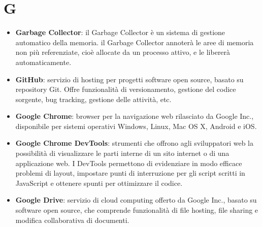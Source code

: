 \newpage
\section{G}

\begin{itemize}
	\item \textbf{Garbage Collector}: il Garbage Collector è un sistema di gestione automatico della memoria. il Garbage Collector annoterà le aree di memoria non più referenziate, cioè allocate da un processo attivo, e le libererà automaticamente.
	\item \textbf{GitHub}: servizio di hosting per progetti software open source, basato su repository Git. Offre funzionalità di versionamento, gestione del codice sorgente, bug tracking, gestione delle attività, etc.
	\item \textbf{Google Chrome}: browser per la navigazione web rilasciato da Google Inc., disponibile per sistemi operativi Windows, Linux, Mac OS X, Android e iOS.
	\item \textbf{Google Chrome DevTools}: strumenti che offrono agli sviluppatori web la possibilità di visualizzare le parti interne di un sito internet o di una applicazione web. I DevTools permettono di evidenziare in modo efficace problemi di layout, impostare punti di interruzione per gli script scritti in JavaScript e ottenere spunti per ottimizzare il codice.
	\item \textbf{Google Drive}: servizio di cloud computing offerto da Google Inc., basato su software open source, che comprende funzionalità di file hosting, file sharing e modifica collaborativa di documenti.
\end{itemize}

